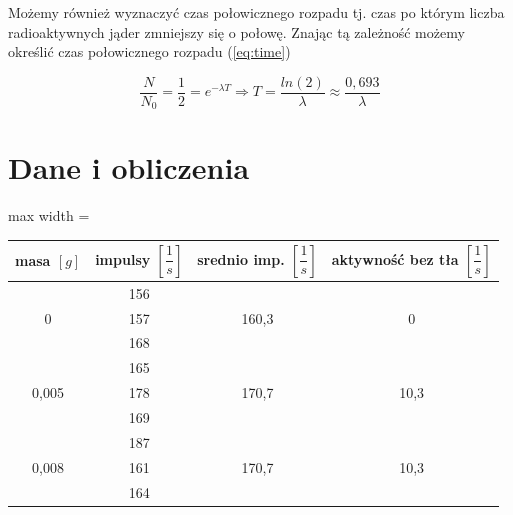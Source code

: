 \documentclass[a4paper,11pt]{extarticle}
\begin{document}
  Możemy również wyznaczyć czas połowicznego rozpadu tj. czas po którym liczba
  radioaktywnych jąder zmniejszy się o połowę. Znając tą zależność możemy określić
  czas połowicznego rozpadu (\ref{eq:time})

  \begin{equation}
    \dfrac{N}{N_0} = \dfrac{1}{2} = e^{-\lambda T} \Rightarrow T = \dfrac{ln(2)}{\lambda} \approx \dfrac{0,693}{\lambda}
    \label{eq:time}
  \end{equation}

  \section{Dane i obliczenia}

  \begin{table}[H]
    \centering
    \begin{adjustbox}{max width = \textwidth}
      \begin{tabular}{cccc}
      \toprule
      \textbf{masa \( [g] \)} & \textbf{impulsy \( [\dfrac{1}{s}] \)} & \textbf{srednio imp. \( [\dfrac{1}{s}] \)} & \textbf{aktywność bez tła \( [\dfrac{1}{s}] \)} \\
      \midrule
      \multirow{3}{*}{0}      & 156                   & \multirow{3}{*}{160,3}    & \multirow{3}{*}{0}              \\
                              & 157                   &                           &                                 \\
                              & 168                   &                           &                                 \\
      \midrule
      \multirow{3}{*}{0,005}  & 165                   & \multirow{3}{*}{170,7}    & \multirow{3}{*}{10,3}           \\
                              & 178                   &                           &                                 \\
                              & 169                   &                           &                                 \\
      \midrule
      \multirow{3}{*}{0,008}  & 187                   & \multirow{3}{*}{170,7}    & \multirow{3}{*}{10,3}           \\
                              & 161                   &                           &                                 \\
                              & 164                   &                           &                                 \\

\end{tabular}
\end{adjustbox}
\end{table}
\end{document}
